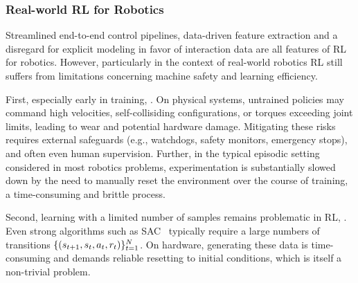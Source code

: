 \subsubsection{Real-world RL for Robotics}
Streamlined end-to-end control pipelines, data-driven feature extraction and a disregard for explicit modeling in favor of interaction data are all features of RL for robotics.
However, particularly in the context of real-world robotics RL still suffers from limitations concerning machine safety and learning efficiency.

First, especially early in training, .
On physical systems, untrained policies may command high velocities, self-collisiding configurations, or torques exceeding joint limits, leading to wear and potential hardware damage.
Mitigating these risks requires external safeguards (e.g., watchdogs, safety monitors, emergency stops), and often even human supervision.
Further, in the typical episodic setting considered in most robotics problems, experimentation is substantially slowed down by the need to manually reset the environment over the course of training, a time-consuming and brittle process.

Second, learning with a limited number of samples remains problematic in RL, .
Even strong algorithms such as SAC~\citep{haarnojaSoftActorCriticOffPolicy2018} typically require a large numbers of transitions \( \{ (s_{t+1}, s_t, a_t, r_t) \}_{t=1}^N \).
On hardware, generating these data is time-consuming and demands reliable resetting to initial conditions, which is itself a non-trivial problem.


